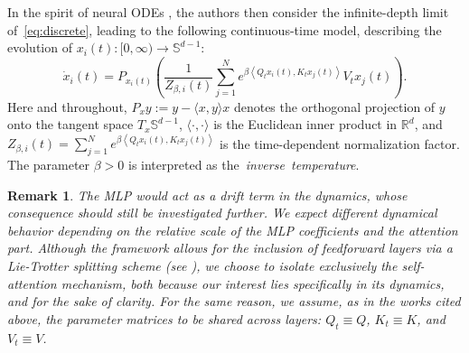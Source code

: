 \documentclass{article}
\numberwithin{theorem}{section}
\newtheorem{remark}[theorem]{Remark}
\begin{document}
In the spirit of neural ODEs \cite{chen2018neural}, the authors then consider the infinite-depth limit of~\eqref{eq:discrete}, leading to the following continuous-time model, describing the evolution of $x_i(t): [0, \infty) \to \mathbb{S}^{d-1}$:
\begin{equation}
\label{eq:ODE_SA}\tag{SA}
\dot{x}_i(t) = P_{x_i(t)}\left(\frac{1}{Z_{\beta, i}(t)} \sum_{j=1}^N e^{\beta\left\langle Q_t x_i(t), K_t x_j(t)\right\rangle} V_t x_j(t)\right).
\end{equation}
Here and throughout, $P_{x}y := y - \langle x, y\rangle x$ denotes the orthogonal projection of $y$ onto the tangent space $T_x\mathbb{S}^{d-1}$, $\langle \cdot, \cdot \rangle$ is the Euclidean inner product in $\mathbb{R}^{d}$,  and $Z_{\beta, i}(t)=\sum_{j=1}^N e^{\beta\left\langle Q_t x_i(t), K_t x_j(t)\right\rangle}$ is the time-dependent normalization factor. The parameter $\beta > 0$ is interpreted as the~\emph{inverse~temperature}.

\begin{remark}
The MLP would act as a drift term in the dynamics, whose consequence should still be investigated further. We expect different dynamical behavior depending on the relative scale of the MLP coefficients and the attention part.
    Although the framework allows for the inclusion of feedforward layers via a Lie-Trotter splitting scheme (see \cite{geshkovski2024measure}), we choose to isolate exclusively the self-attention mechanism, both because our interest lies specifically in its dynamics, and for the sake of clarity.  For the same reason, we assume, as in the works cited above, the parameter matrices to be shared across layers: $Q_t \equiv Q$, $K_t \equiv K$, and $V_t \equiv V$.
\end{remark}
\end{document}
